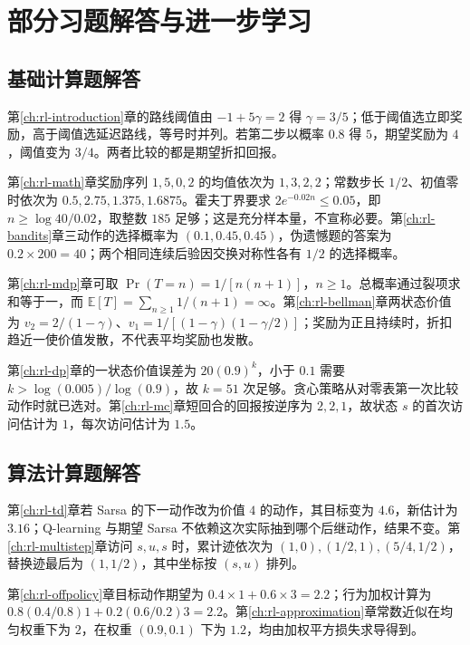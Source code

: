 \setcounter{chapter}{2} %
\chapter{部分习题解答与进一步学习}
\label{app:rl-exercises}

\section{基础计算题解答}

第\ref{ch:rl-introduction}章的路线阈值由 $-1+5\gamma=2$ 得 $\gamma=3/5$；低于阈值选立即奖励，高于阈值选延迟路线，等号时并列。若第二步以概率 $0.8$ 得 $5$，期望奖励为 $4$，阈值变为 $3/4$。两者比较的都是期望折扣回报。

第\ref{ch:rl-math}章奖励序列 $1,5,0,2$ 的均值依次为 $1,3,2,2$；常数步长 $1/2$、初值零时依次为 $0.5,2.75,1.375,1.6875$。霍夫丁界要求 $2e^{-0.02n}\leq0.05$，即 $n\geq\log40/0.02$，取整数 $185$ 足够；这是充分样本量，不宣称必要。第\ref{ch:rl-bandits}章三动作的选择概率为 $(0.1,0.45,0.45)$，伪遗憾题的答案为 $0.2\times200=40$；两个相同连续后验因交换对称性各有 $1/2$ 的选择概率。

第\ref{ch:rl-mdp}章可取 $\Pr(T=n)=1/[n(n+1)]$，$n\geq1$。总概率通过裂项求和等于一，而 $\mathbb E[T]=\sum_{n\geq1}1/(n+1)=\infty$。第\ref{ch:rl-bellman}章两状态价值为 $v_2=2/(1-\gamma)$、$v_1=1/[(1-\gamma)(1-\gamma/2)]$；奖励为正且持续时，折扣趋近一使价值发散，不代表平均奖励也发散。

第\ref{ch:rl-dp}章的一状态价值误差为 $20(0.9)^k$，小于 $0.1$ 需要 $k>\log(0.005)/\log(0.9)$，故 $k=51$ 次足够。贪心策略从对零表第一次比较动作时就已选对。第\ref{ch:rl-mc}章短回合的回报按逆序为 $2,2,1$，故状态 $s$ 的首次访问估计为 $1$，每次访问估计为 $1.5$。

\section{算法计算题解答}

第\ref{ch:rl-td}章若 Sarsa 的下一动作改为价值 $4$ 的动作，其目标变为 $4.6$，新估计为 $3.16$；Q-learning 与期望 Sarsa 不依赖这次实际抽到哪个后继动作，结果不变。第\ref{ch:rl-multistep}章访问 $s,u,s$ 时，累计迹依次为 $(1,0),(1/2,1),(5/4,1/2)$，替换迹最后为 $(1,1/2)$，其中坐标按 $(s,u)$ 排列。

第\ref{ch:rl-offpolicy}章目标动作期望为 $0.4\times1+0.6\times3=2.2$；行为加权计算为 $0.8(0.4/0.8)1+0.2(0.6/0.2)3=2.2$。第\ref{ch:rl-approximation}章常数近似在均匀权重下为 $2$，在权重 $(0.9,0.1)$ 下为 $1.2$，均由加权平方损失求导得到。

